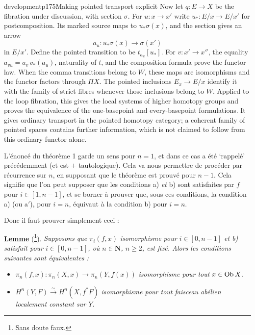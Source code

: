 \begin{dcomment}{development}{p175}{Making pointed transport explicit}
Now let $q:E\to X$ be the fibration under discussion, with section $\sigma$. For $u:x\to x'$ write $u_*:E/x\to E/x'$ for postcomposition. Its marked source maps to $u_*\sigma(x)$, and the section gives an arrow
\[
 a_u:u_*\sigma(x)\longrightarrow\sigma(x')
\]
in $E/x'$. Define the pointed transition to be $t_{a_u}[u_*]$. For $v:x'\to x''$, the equality $a_{vu}=a_v\,v_*(a_u)$, naturality of $t$, and the composition formula prove the functor law. When the comma transitions belong to $W$, these maps are isomorphisms and the functor factors through $\Pi X$. The pointed inclusions $E_x\to E/x$ identify it with the family of strict fibres whenever those inclusions belong to $W$. Applied to the loop fibration, this gives the local systems of higher homotopy groups and proves the equivalence of the one-basepoint and every-basepoint formulations. It gives ordinary transport in the pointed homotopy category; a coherent family of pointed spaces contains further information, which is not claimed to follow from this ordinary functor alone.
\end{dcomment}


L'énoncé du théorème 1 garde un sens pour $n = 1$, et dans ce cas a été `rappelé' précédemment (et est $\pm$ tautologique). Cela va nous permettre de procéder par récurrence sur $n$, en supposant que le théorème est prouvé pour $n-1$. Cela signifie que l'on peut supposer que les conditions a) \textit{et} b) sont satisfaites par $f$ pour $i \in [1,n-1]$, et se borner à prouver que, sous ces conditions, la condition a) (ou a$'$), pour $i = n$, équivaut à la condition b) pour $i = n$.


Donc il faut prouver simplement ceci :

\textbf{Lemme} (\footnote[115]{Sans doute faux.}). \textit{Supposons que $\pi_i(f,x)$} \textit{isomorphisme pour $i \in [0,n-1]$ et b) satisfait pour $i \in [0,n-1]$, où $n \in \mathbf{N}$, $n \geq 2$, est fixé. Alors les conditions suivantes sont équivalentes :}

\begin{itemize}
\item[\textit{a)}] $\pi_n(f,x) : \pi_n(X,x) \longrightarrow \pi_n(Y,f(x))$ \textit{isomorphisme pour tout $x \in \mathrm{Ob}\, X$.}

\item[\textit{b)}] $H^n(Y,F) \xrightarrow{\sim} H^n(X,f^*F)$ \textit{isomorphisme pour tout faisceau abélien localement constant sur $Y$.}
\end{itemize}

